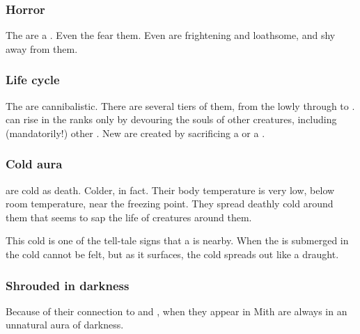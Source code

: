 \subsubsection{Horror}
The \banes{} are a . Even the \resphain{} fear them. Even \lesserbanes{} are frightening and loathsome, and \resphain{} shy away from them.





\subsubsection{Life cycle}
\label{Bane cannibalism}
The \banes are cannibalistic. 
There are several tiers of them, from the lowly \banespawn{} through \lesserbanes{} to \banelords. \Banes{} can rise in the ranks only by devouring the souls of other creatures, including (mandatorily!) other \banes. New \banespawn{} are created by sacrificing a \lesserbane{} or a \banelord. 





\subsubsection{Cold aura}
\label{Banes are cold}
\Banes{} are cold as death. Colder, in fact. Their body temperature is very low, below room temperature, near the freezing point. They spread deathly cold around them that seems to sap the life of creatures around them. 

This cold is one of the tell-tale signs that a \bane{} is nearby. When the \bane{} is submerged in \Nyx{} the cold cannot be felt, but as it surfaces, the cold spreads out like a draught. 





\subsubsection{Shrouded in darkness}
Because of their connection to \Nyx{} and \Erebos, when they appear in Mith \banes{} are always  in an unnatural aura of darkness. 






